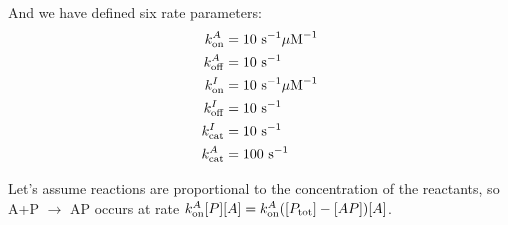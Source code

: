 \documentclass{exam}
\begin{document}
And we have defined six rate parameters: 
\begin{align*}
k_{\rm on}^A &= 10 ~\mbox{s}^{-1}\mu\mbox{M}^{-1}\\
k_{\rm off}^A &= 10 ~\mbox{s}^{-1} \\
k_{\rm on}^I &= 10 ~\mbox{s}^{-1}\mu\mbox{M}^{-1}\\
k_{\rm off}^I &= 10 ~\mbox{s}^{-1}\\
k_{\rm cat}^I &= 10 ~\mbox{s}^{-1}\\
k_{\rm cat}^A &= 100 ~\mbox{s}^{-1}
\end{align*}

Let's assume reactions are proportional to the concentration of the reactants, so A+P $\rightarrow$ AP occurs at rate $k_{\rm on}^A [P] [A] = k_{\rm on}^A ([P_{\rm tot}] - [AP]) [A]$.
\end{document}
